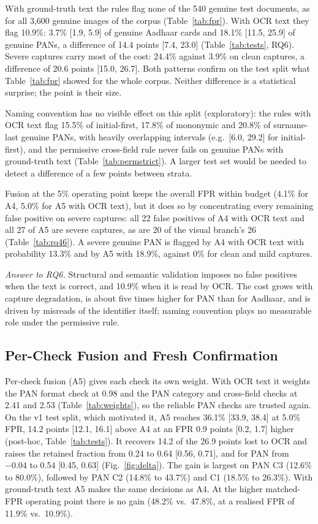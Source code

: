 \documentclass[conference]{IEEEtran}
\begin{document}
With ground-truth text the rules flag none of the 540 genuine test
documents, as for all 3{,}600 genuine images of the corpus
(Table~\ref{tab:fpr}).
With OCR text they flag 10.9\%: 3.7\% [1.9, 5.9] of genuine Aadhaar
cards and 18.1\% [11.5, 25.9] of genuine PANs, a difference of 14.4
points [7.4, 23.0] (Table~\ref{tab:tests}, RQ6). Severe captures carry
most of the cost: 24.4\% against 3.9\% on clean captures, a difference
of 20.6 points [15.0, 26.7]. Both patterns confirm on the test split
what Table~\ref{tab:fpr} showed for the whole corpus. Neither
difference is a statistical surprise; the point is their size.

Naming convention has no visible effect on this split (exploratory):
the rules with OCR text flag 15.5\% of initial-first, 17.8\% of
mononymic and 20.8\% of surname-last genuine PANs, with heavily
overlapping intervals (e.g.\ [6.0, 29.2] for initial-first), and the
permissive cross-field rule never fails on genuine PANs with
ground-truth text (Table~\ref{tab:permstrict}). A larger test set would
be needed to detect a difference of a few points between strata.

Fusion at the 5\% operating point keeps the overall FPR within budget
(4.1\% for A4, 5.0\% for A5 with OCR text), but it does so by
concentrating every remaining false positive on severe captures: all
22 false positives of A4 with OCR text and all 27 of A5 are severe
captures, as are 20 of the visual branch's 26 (Table~\ref{tab:rq46}).
A severe genuine PAN is flagged by A4 with OCR text with probability
13.3\% and by A5 with 18.9\%, against 0\% for clean and mild captures.

\emph{Answer to RQ6.} Structural and semantic validation imposes no
false positives when the text is correct, and 10.9\% when it is read by
OCR. The cost grows with capture degradation, is about five times higher
for PAN than for Aadhaar, and is driven by misreads of the identifier
itself; naming convention plays no measurable role under the permissive
rule.

\subsection{Per-Check Fusion and Fresh Confirmation}
\label{subsec:res-a5}

Per-check fusion (A5) gives each check its own weight. With OCR text it
weights the PAN format check at 0.98 and the PAN category and
cross-field checks at 2.41 and 2.53 (Table~\ref{tab:weights}), so the
reliable PAN checks are trusted again. On the v1 test split, which
motivated it, A5 reaches 36.1\% [33.9, 38.4] at 5.0\% FPR, 14.2 points
[12.1, 16.1] above A4 at an FPR 0.9 points [0.2, 1.7] higher (post-hoc,
Table~\ref{tab:tests}). It recovers 14.2 of the 26.9 points lost to OCR
and raises the retained fraction from 0.24 to 0.64 [0.56, 0.71], and
for PAN from $-0.04$ to 0.54 [0.45, 0.63] (Fig.~\ref{fig:delta}). The
gain is largest on PAN C3 (12.6\% to 80.0\%), followed by PAN C2 (14.8\%
to 43.7\%) and C1 (18.5\% to 26.3\%). With ground-truth text A5 makes
the same decisions as A4. At the higher matched-FPR operating point
there is no gain (48.2\% vs.\ 47.8\%, at a realised FPR of 11.9\% vs.\
10.9\%).
\end{document}
